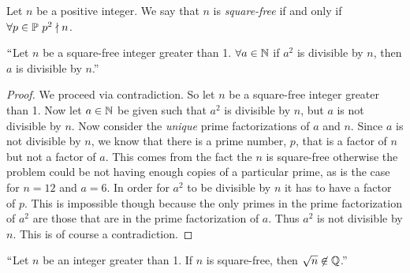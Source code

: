         \begin{definition}
            Let $n$ be a positive integer. We say that $n$ is \emph{square-free} if and only if
            $\forall p \in \set{P} \ \ndivides{p^2}{n}$.
        \end{definition}
        \begin{lemma}
            $``$Let $n$ be a square-free integer greater than 1. $\forall a \in \mathbb{N}$
            if $a^2$ is divisible by $n$, then $a$ is divisible by $n$.''
            \label{Square root of n irrational proof lemma}
        \end{lemma}
        \begin{proof}
            We proceed via contradiction. So let $n$ be a square-free integer greater than 1.
            Now let $a \in \mathbb{N}$ be given such that $a^2$ is divisible by $n$, but
            $a$ is not divisible by $n$. Now consider the \emph{unique} prime factorizations
            of $a$ and $n$. Since $a$ is not divisible by $n$, we know that there is a prime
            number, $p$, that is a factor of $n$ but not a factor of $a$. This comes from the fact
            the $n$ is square-free otherwise the problem could be not having enough copies of a
            particular prime, as is the case for $n = 12$ and $a = 6$. In order for $a^2$
            to be divisible by $n$ it has to have a factor of $p$. This is impossible though
            because the only primes in the prime factorization of $a^2$ are those that are
            in the prime factorization of $a$. Thus $a^2$ is not divisible by $n$. This is
            of course a contradiction. \QED
        \end{proof}
        \begin{theorem}
            $``$Let $n$ be an integer greater than 1. If $n$ is square-free, then $\sqrt{n} \not\in \mathbb{Q}$.''
            \label{Square Root of Square Free Irrational}
        \end{theorem}
